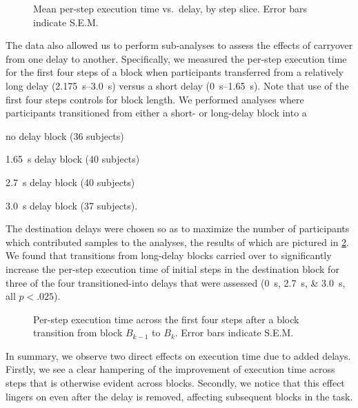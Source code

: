\begin{figure}[h]
    \centering
    \caption{Mean per-step execution time vs.\ delay, by step slice.
    Error bars indicate S.E.M.}
    \label{fig:exectime:delay:slice}
\end{figure}

The data also allowed us to perform sub-analyses to assess the effects of carryover from one delay to another.
Specifically, we measured the per-step execution time for the first four steps of a block when participants transferred from a relatively long delay (\SIrange{2.175}{3.0}{\second}) versus a short delay (\SIrange{0}{1.65}{\second}).
Note that use of the first four steps controls for block length.
We performed analyses where participants transitioned from either a short- or long-delay block into a
\begin{enumerate*}[label=(\roman*), before=\unskip{: }, itemjoin={{; }}, itemjoin*={{; and }}]
  \item no delay block (36 subjects)
  \item \SI{1.65}{\second} delay block (40 subjects)
  \item \SI{2.7}{\second} delay block (40 subjects)
  \item \SI{3.0}{\second} delay block (37 subjects).
\end{enumerate*}
The destination delays were chosen so as to maximize the number of participants which contributed samples to the analyses, the results of which are pictured in \cref{fig:exectime:transition}.
We found that transitions from long-delay blocks carried over to significantly increase the per-step execution time of initial steps in the destination block for three of the four transitioned-into delays that were assessed (\SIlist{0;2.7;3.0}{\second}, all \( p < .025\)).

\begin{figure}[h]
  \centering
  \caption{Per-step execution time across the first four steps after a block transition from block \( B_{k-1} \) to \( B_k \). Error bars indicate S.E.M.}\label{fig:exectime:transition}%
\end{figure}

In summary, we observe two direct effects on execution time due to added delays.
Firstly, we see a clear hampering of the improvement of execution time across steps that is otherwise evident across blocks.
Secondly, we notice that this effect lingers on even after the delay is removed, affecting subsequent blocks in the task.

